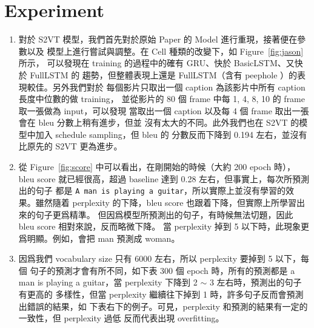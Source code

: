 \documentclass[12pt, a4paper]{article}
\theoremstyle{mystyle}	%
\begin{document}
\section{Experiment}
\begin{enumerate}
\item  對於 S2VT 模型，我們首先對於原始 Paper 的 Model 進行重現，接著便在參數以及
模型上進行嘗試與調整。在 Cell 種類的改變下，如 Figure~\ref{fig:jason} 所示，
可以發現在 training 的過程中的確有 GRU、快於 BasicLSTM、又快於 FullLSTM 的
趨勢，但整體表現上還是 FullLSTM（含有 peephole ）的表現較佳。另外我們對於
每個影片只取出一個 caption 為該影片中所有 caption 長度中位數的做 training，
並從影片的 80 個 frame 中每 1, 4, 8, 10 的 frame 取一張做為 input，可以發現
當取出一個 caption 以及每 4 個 frame 取出一張會在 bleu 分數上稍有進步，但並
沒有太大的不同。此外我們也在 S2VT 的模型中加入 schedule sampling，但 bleu 的
分數反而下降到 0.194 左右，並沒有比原先的 S2VT 更為進步。
\item 從 Figure~\ref{fig:score} 中可以看出，在剛開始的時候（大約 200 epoch 時），
  bleu score 就已經很高，超過 baseline 達到 0.28 左右，但事實上，每次所預測出的句子
  都是 \texttt{A man is playing a guitar}，所以實際上並沒有學習的效果。雖然隨着
  perplexity 的下降，bleu score 也跟着下降，但實際上所學習出來的句子更爲精準。
  但因爲模型所預測出的句子，有時候無法切題，因此 bleu score 相對來說，反而略微下降。
  當 perplexity 掉到 5 以下時，此現象更爲明顯。例如，會把 man 預測成 woman。
\item 因爲我們 vocabulary size 只有 6000 左右，所以 perplexity 要掉到 5 以下，每個
  句子的預測才會有所不同，如下表 300 個 epoch 時，所有的預測都是 a man is 
  playing a guitar，當 perplexity 下降到 2 $\sim$ 3 左右時，預測出的句子有更高的
  多樣性，但當 perplexity 繼續往下掉到 1 時，許多句子反而會預測出錯誤的結果，如
  下表右下的例子。可見，perplexity 和預測的結果有一定的一致性，但 perplexity 過低
  反而代表出現 overfitting。 \\
\end{enumerate}
\end{document}
